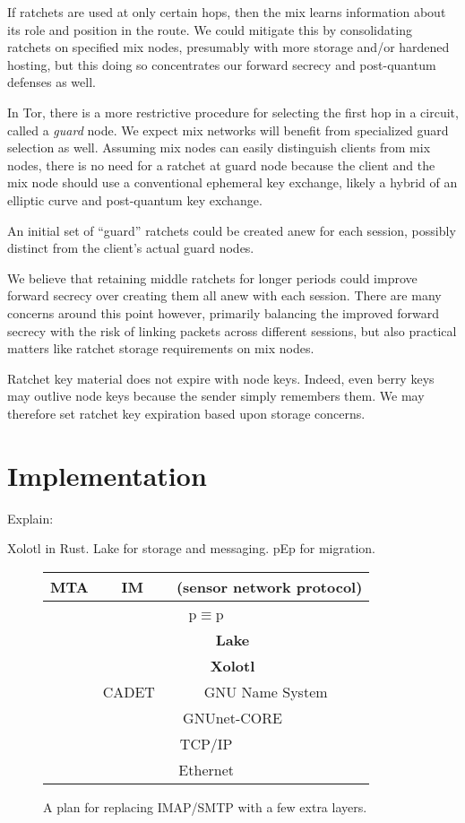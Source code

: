 \documentclass[twoside,letterpaper]{llncs}
\begin{document}
If ratchets are used at only certain hops, then the mix learns
information about its role and position in the route.  
We could mitigate this by consolidating ratchets on specified mix
nodes, presumably with more storage and/or hardened hosting, but
this doing so concentrates our forward secrecy and post-quantum 
defenses as well.

In Tor, there is a more restrictive procedure for selecting the
first hop in a circuit, called a {\it guard} node.  We expect
mix networks will benefit from specialized guard selection as well.
Assuming mix nodes can easily distinguish clients from mix nodes,
there is no need for a ratchet at guard node because the client and
the mix node should use a conventional ephemeral key exchange,
likely a hybrid of an elliptic curve and post-quantum key exchange.

An initial set of ``guard'' ratchets could be created anew for each
session, possibly distinct from the client's actual guard nodes.

We believe that retaining middle ratchets for longer periods could
improve forward secrecy over creating them all anew with each session. 
There are many concerns around this point however, primarily balancing
the improved forward secrecy with the risk of linking packets across
different sessions, but also
 practical matters like ratchet storage requirements on mix nodes.  

Ratchet key material does not expire with node keys.  Indeed, even
berry keys may outlive node keys because the sender simply remembers
them.  We may therefore set ratchet key expiration based upon storage
concerns. 


\section{Implementation}

Explain:

Xolotl in Rust.
Lake for storage and messaging.
pEp for migration.

\begin{figure}
\begin{center}
\begin{tabular}{|c|c|c|} \hline
   MTA & IM & (sensor network protocol) \\ \hline
   \multicolumn{3}{|c|}{{p$\equiv$p}}  \\ \hline
   & \multicolumn{2}{|c|}{{\bf Lake}}   \\ \cline{2-3}
   & \multicolumn{2}{|c|}{{\bf Xolotl}} \\ \cline{2-3}
   \raisebox{1.5ex}{SMTP} & CADET~\cite{cadet} & GNU Name System~\cite{gns}  \\ \cline{2-3}
   & \multicolumn{2}{|c|}{GNUnet-CORE}  \\ \hline
   \multicolumn{3}{|c|}{TCP/IP}       \\ \hline
   \multicolumn{3}{|c|}{Ethernet}     \\ \hline
\end{tabular}
\end{center}
\caption{A plan for replacing IMAP/SMTP with a few extra layers.}
\label{fig:layers}
\end{figure}
\end{document}
